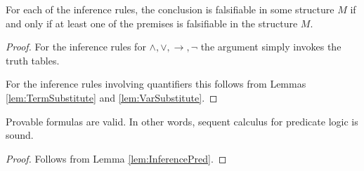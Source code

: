 \begin{page}
\setcounter{section}{2}
\setcounter{subsection}{2}
\setcounter{dfn}{5}
\label{portion:629}

\begin{lem}
\label{lem:InferencePred}
For each of the inference rules, the conclusion is falsifiable in some structure $M$
if and only if at least one of the premises is falsifiable in the structure $M$.
\end{lem}

\end{page}

\begin{page}
\setcounter{section}{2}
\setcounter{subsection}{2}
\setcounter{dfn}{5}
\label{portion:630}

\begin{proof}
For the inference rules for $\wedge, \vee, \to, \neg$ the argument simply invokes the truth tables.

For the inference rules involving quantifiers this follows from Lemmas \ref{lem:TermSubstitute} and \ref{lem:VarSubstitute}.
\end{proof}


\end{page}

\begin{page}
\setcounter{section}{2}
\setcounter{subsection}{2}
\setcounter{dfn}{6}
\label{portion:632}

\begin{thm}
Provable formulas are valid.
In other words, sequent calculus for predicate logic is sound.
\end{thm}

\end{page}

\begin{page}
\setcounter{section}{2}
\setcounter{subsection}{2}
\setcounter{dfn}{6}
\label{portion:633}

\begin{proof}
Follows from Lemma \ref{lem:InferencePred}.
\end{proof}



\end{page}

